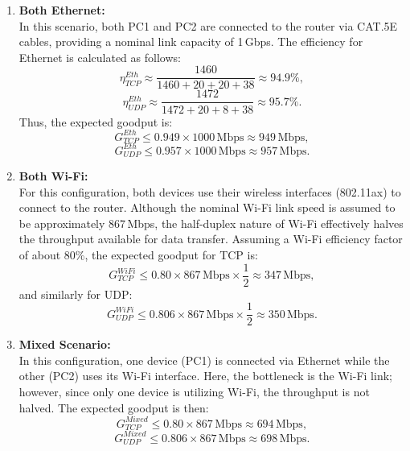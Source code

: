         \begin{enumerate}

            \item \textbf{Both Ethernet:} \\
            In this scenario, both PC1 and PC2 are connected to the router via CAT.5E cables, providing a nominal link capacity of 1\,Gbps. 
            The efficiency for Ethernet is calculated as follows:
            \[
            \eta_{TCP}^{Eth} \approx \frac{1460}{1460 + 20 + 20 + 38} \approx 94.9\%,
            \]
            \[
            \eta_{UDP}^{Eth} \approx \frac{1472}{1472 + 20 + 8 + 38} \approx 95.7\%.
            \]
            Thus, the expected goodput is:
            \[
            G_{TCP}^{Eth} \leq 0.949 \times 1000\,\text{Mbps} \approx 949\,\text{Mbps},
            \]
            \[
            G_{UDP}^{Eth} \leq 0.957 \times 1000\,\text{Mbps} \approx 957\,\text{Mbps}.
            \]

            \vspace{0.2cm} %

            \item \textbf{Both Wi-Fi:} \\
            For this configuration, both devices use their wireless interfaces (802.11ax) to connect to the router. 
            Although the nominal Wi-Fi link speed is assumed to be approximately 867\,Mbps, the half-duplex nature of Wi-Fi effectively halves the throughput available for data transfer. 
            Assuming a Wi-Fi efficiency factor of about 80\%, the expected goodput for TCP is:
            \[
            G_{TCP}^{WiFi} \leq 0.80 \times 867\,\text{Mbps} \times \frac{1}{2} \approx 347\,\text{Mbps},
            \]
            and similarly for UDP:
            \[
            G_{UDP}^{WiFi} \leq 0.806 \times 867\,\text{Mbps} \times \frac{1}{2} \approx 350\,\text{Mbps}.
            \]


            \item \textbf{Mixed Scenario:} \\
            In this configuration, one device (PC1) is connected via Ethernet while the other (PC2) uses its Wi-Fi interface. 
            Here, the bottleneck is the Wi-Fi link; however, since only one device is utilizing Wi-Fi, the throughput is not halved. 
            The expected goodput is then:
            \[
            G_{TCP}^{Mixed} \leq 0.80 \times 867\,\text{Mbps} \approx 694\,\text{Mbps},
            \]
            \[
            G_{UDP}^{Mixed} \leq 0.806 \times 867\,\text{Mbps} \approx 698\,\text{Mbps}.
            \]

        \end{enumerate}

